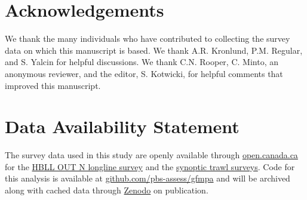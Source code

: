 \documentclass[12pt]{article}
\begin{document}
\begin{spacing}{1.4}



\section*{Acknowledgements}

We thank the many individuals who have contributed to collecting the survey data on which this manuscript is based.
We thank A.R. Kronlund, P.M. Regular, and S. Yalcin for helpful discussions.
We thank C.N. Rooper, C. Minto, an anonymous reviewer, and the editor, S. Kotwicki, for helpful comments that improved this manuscript.

\section*{Data Availability Statement}

The survey data used in this study are openly available through \href{open.canada.ca}{open.canada.ca} for the \href{https://open.canada.ca/data/en/dataset/524fde54-1d93-4d22-bb83-df542780a719}{HBLL OUT N longline survey} and the \href{https://open.canada.ca/data/en/dataset/a278d1af-d567-4964-a109-ae1e84cbd24a}{synoptic trawl surveys}.
Code for this analysis is available at \href{https://github.com/pbs-assess/gfmpa}{github.com/pbs-assess/gfmpa} and will be archived along with cached data through \href{https://zenodo.org/}{Zenodo} on publication.



\end{spacing}
\end{document}
